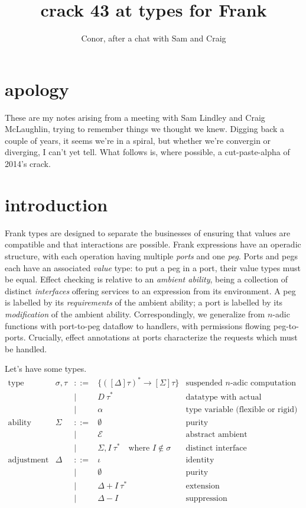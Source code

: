 \documentclass{article}
\begin{document}
\title{crack 43 at types for Frank}
\author{Conor, after a chat with Sam and Craig}
\maketitle

\section*{apology}

These are my notes arising from a meeting with Sam Lindley and Craig McLaughlin, trying to remember things we thought we knew. Digging back a couple of years, it seems we're in a spiral, but whether we're convergin or diverging, I can't yet tell. What follows is, where possible, a cut-paste-alpha of 2014's crack.

\section{introduction}

Frank types are designed to separate the businesses of ensuring that values are compatible and that interactions are possible. Frank expressions have an operadic structure, with each operation having multiple \emph{ports} and one \emph{peg}. Ports and pegs each have an associated \emph{value} type: to put a peg in a port, their value types must be equal. Effect checking is relative to an \emph{ambient ability}, being a collection of distinct \emph{interfaces} offering services to an expression from its environment. A peg is labelled by its \emph{requirements} of the ambient ability; a port is labelled by its \emph{modification} of the ambient ability. Correspondingly, we generalize from $n$-adic functions with port-to-peg dataflow to handlers, with permissions flowing peg-to-ports. Crucially, effect annotations at ports characterize the requests which must be handled.

Let's have some types.
\newcommand{\ix}[2]{\ulcorner #2 \urcorner^{#1}}
\newcommand{\ea}{\mathcal{E}}
\newcommand{\ixp}[2]{( #2 )^{#1}}
\[\begin{array}{lrrll}
\mbox{type} &
\sigma,\tau & ::= & \{([\Delta]\tau)^\ast\to[\Sigma]\tau\} & \mbox{suspended $n$-adic computation} \\
  && | & D\:\tau^\ast & \mbox{datatype with actual parameters} \\
  && | & \alpha & \mbox{type variable (flexible or rigid)}\\
\mbox{ability} &
\Sigma & ::= & \emptyset & \mbox{purity} \\
   && | & \ea & \mbox{abstract ambient} \\
   && | & \Sigma, I\:\tau^\ast\quad\mbox{where $I\not\in\sigma$} & \mbox{distinct interface}\\
\mbox{adjustment} &
\Delta & ::= & \iota & \mbox{identity} \\
   && | & \emptyset & \mbox{purity} \\
   && | & \Delta + I\:\tau^\ast & \mbox{extension}\\
   && | & \Delta - I & \mbox{suppression}\\
\end{array}\]
\end{document}
